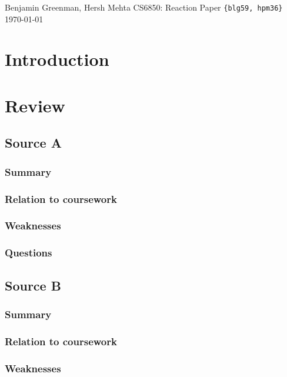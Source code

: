 \documentclass{article}
\renewcommand\maketitle{
\begin{flushleft}
{%
\large{%
Benjamin Greenman,
Hersh Mehta
\hfill
CS6850: Reaction Paper
\texttt{\{blg59, hpm36\}} \hfill \today
}}\\
\hrulefill
\end{flushleft}
}
\begin{document}
\maketitle

\section{Introduction}

\section{Review}
\subsection{Source A}
\subsubsection{Summary}
\subsubsection{Relation to coursework}
\subsubsection{Weaknesses}
\subsubsection{Questions}

\subsection{Source B}
\subsubsection{Summary}
\subsubsection{Relation to coursework}
\subsubsection{Weaknesses}
\end{document}
